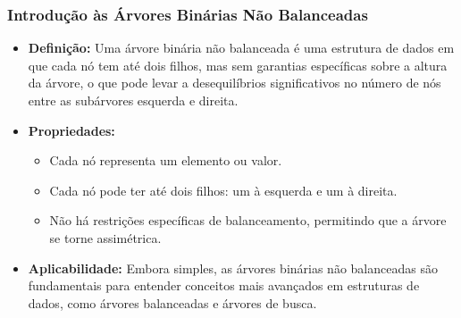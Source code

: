 \begin{frame}[fragile]
  \frametitle{Introdução às Árvores Binárias Não Balanceadas}
  \begin{itemize}
    \item \textbf{Definição:} Uma árvore binária não balanceada é uma estrutura de dados em que cada nó tem até dois filhos, mas sem garantias específicas sobre a altura da árvore, o que pode levar a desequilíbrios significativos no número de nós entre as subárvores esquerda e direita.
    \item \textbf{Propriedades:}
      \begin{itemize}
        \item Cada nó representa um elemento ou valor.
        \item Cada nó pode ter até dois filhos: um à esquerda e um à direita.
        \item Não há restrições específicas de balanceamento, permitindo que a árvore se torne assimétrica.
      \end{itemize}
    \item \textbf{Aplicabilidade:} Embora simples, as árvores binárias não balanceadas são fundamentais para entender conceitos mais avançados em estruturas de dados, como árvores balanceadas e árvores de busca.
  \end{itemize}
\end{frame}

